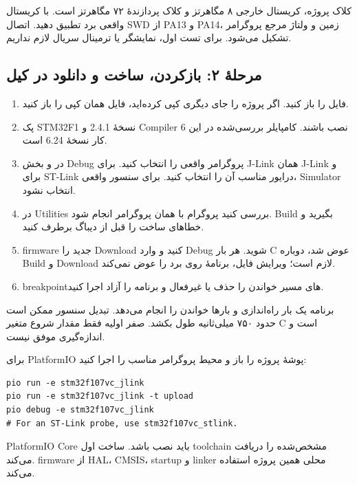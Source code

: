 کلاک پروژه، کریستال خارجی ۸ مگاهرتز و کلاک پردازندهٔ ۷۲ مگاهرتز است. با کریستال واقعی برد تطبیق دهید. اتصال SWD از PA13 و PA14، زمین و ولتاژ مرجع پروگرامر تشکیل می‌شود. برای تست اول، نمایشگر یا ترمینال سریال لازم نداریم.


\subsection{مرحلهٔ ۲: بازکردن، ساخت و دانلود در کیل}
\begin{enumerate}
\item فایل
را باز کنید. اگر پروژه را جای دیگری کپی کرده‌اید، فایل همان کپی را باز کنید.
\item پک STM32F1 نسخهٔ 2.4.1 و Compiler 6 نصب باشند. کامپایلر بررسی‌شده در این کار نسخهٔ 6.24 است.
\item در
و بخش Debug پروگرامر واقعی را انتخاب کنید. برای J-Link همان J-Link و برای ST-Link درایور مناسب آن را انتخاب کنید. برای سنسور واقعی، Simulator انتخاب نشود.
\item در Utilities بررسی کنید پروگرام با همان پروگرامر انجام شود. Build بگیرید و خطاهای ساخت را قبل از دیباگ برطرف کنید.
\item firmware جدید را Download کنید و وارد Debug شوید. هر بار C عوض شد، دوباره Build و Download لازم است؛ ویرایش فایل، برنامهٔ روی برد را عوض نمی‌کند.
\item breakpointهای مسیر خواندن را حذف یا غیرفعال و برنامه را آزاد اجرا کنید.
\end{enumerate}
برنامه یک بار راه‌اندازی و بارها خواندن را انجام می‌دهد. تبدیل سنسور ممکن است حدود ۷۵۰ میلی‌ثانیه طول بکشد. صفر اولیه فقط مقدار شروع متغیر C است و اندازه‌گیری موفق نیست.

برای PlatformIO پوشهٔ پروژه را باز و محیط پروگرامر مناسب را اجرا کنید:
\begin{LTR}
\begin{lstlisting}[language={},numbers=none]
pio run -e stm32f107vc_jlink
pio run -e stm32f107vc_jlink -t upload
pio debug -e stm32f107vc_jlink
# For an ST-Link probe, use stm32f107vc_stlink.
\end{lstlisting}
\end{LTR}
PlatformIO Core باید نصب باشد. ساخت اول toolchain مشخص‌شده را دریافت می‌کند. firmware از HAL، CMSIS، startup و linker محلی همین پروژه استفاده می‌کند.

